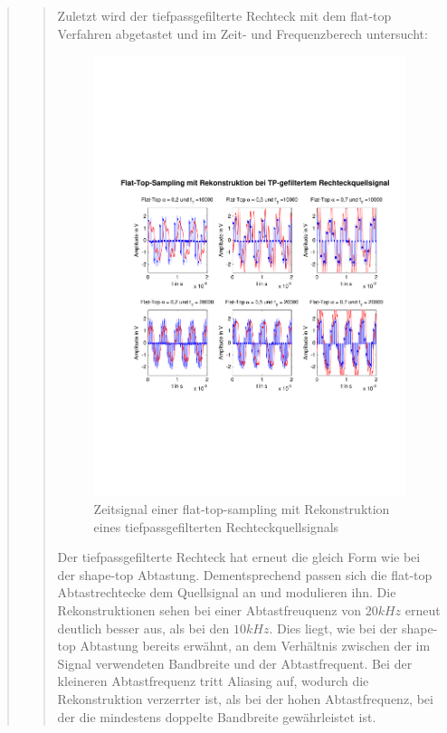 \begin{quote}
\begin{quote}
      	    Zuletzt wird der tiefpassgefilterte Rechteck mit dem flat-top
      	    Verfahren abgetastet und im Zeit- und Frequenzberech untersucht:
      	    
      	    \begin{figure}[H]
            \centering
            \includegraphics[scale=0.6, trim = 1.5cm 6cm 1cm 8cm,
            clip]{./Bilder/flat-top-tp-recht}
                \caption{Zeitsignal einer flat-top-sampling mit Rekonstruktion
                eines tiefpassgefilterten Rechteckquellsignals}
      	    \end{figure}
      	    
      	    Der tiefpassgefilterte Rechteck hat erneut die gleich Form wie bei
      	    der shape-top Abtastung. Dementsprechend passen sich die flat-top 
      	    Abtastrechtecke dem Quellsignal an und modulieren ihn. Die
      	    Rekonstruktionen sehen bei einer Abtastfreuquenz von $20 kHz$
      	    erneut deutlich besser aus, als bei den $10 kHz$. Dies liegt, wie
      	    bei der shape-top Abtastung bereits erwähnt, an dem Verhältnis
      	    zwischen der im Signal verwendeten Bandbreite und der
      	    Abtastfrequent. Bei der kleineren Abtastfrequenz tritt
      	    Aliasing auf, wodurch die Rekonstruktion verzerrter ist, als bei der
      	    hohen Abtastfrequenz, bei der die mindestens doppelte Bandbreite
      	    gewährleistet ist.\\
      	    

\end{quote}
\end{quote}
